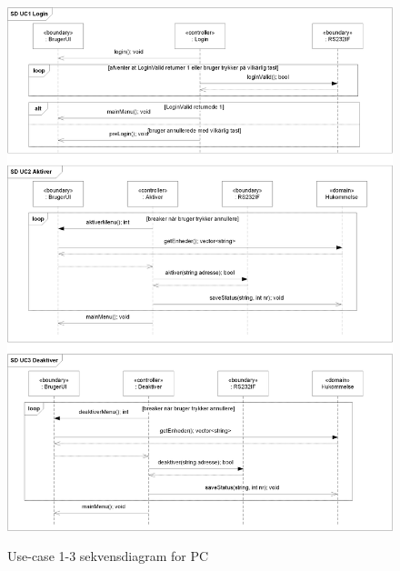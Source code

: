 \begin{figure}[!htb]
     {\includegraphics[width=\textwidth]{billeder/uml/PC_SD1}}
     \caption{Use-case 1-3 sekvensdiagram for PC}
     \label{fig:PC_SD1}
\end{figure}
\clearpage

